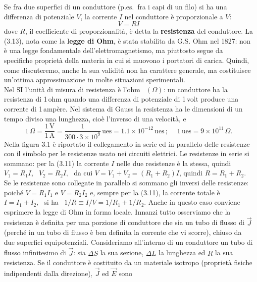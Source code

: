 Se fra due superfici di un conduttore (p.es.\ fra i capi di un filo) si ha una
differenza di potenziale $V$, la corrente $I$ nel conduttore \`e proporzionale a
$V$:
\begin{equation}
  V=RI
  \tag{3.13}
\end{equation}
dove $R$, il coefficiente di proporzionalit\`a, \`e detta la \textbf{resistenza}
del conduttore. La (3.13), nota come la \textbf{legge di Ohm}, \`e stata
stabilita da G.S. Ohm nel 1827: non \`e una legge fondamentale
dell'elettromagnetismo, ma piuttosto segue da specifiche propriet\`a della
materia in cui si muovono i portatori di carica. Quindi, come discuteremo, anche
la sua validit\`a non ha carattere generale, ma costituisce un'ottima
approssimazione in molte situazioni sperimentali.\\
Nel SI l'unit\`a di misura di resistenza \`e l'ohm \ $(\Omega)$: un conduttore
ha la resistenza di 1\,ohm quando una differenza di potenziale di 1\,volt
produce una corrente di 1\,amp\`ere. Nel sistema di Gauss la resistenza ha le
dimensioni di un tempo diviso una lunghezza, cio\`e l'inverso di una velocit\`a,
e
\begin{equation}
  1\,\Omega=\frac{1\,\mathrm V}{1\,\mathrm A}
  =\frac{1}{300\cdot3\times10^9}\,\mathrm{ues}
  =1.1\times10^{-12}\,\mathrm{ues}\,;
  \quad\ 1\,\mathrm{ues}=9\times10^{11}\,\Omega.
  \tag{3.14}
\end{equation}
Nella figura 3.1 \`e riportato il collegamento in serie ed in parallelo delle
resistenze con il simbolo per le resistenze usato nei circuiti elettrici. Le
resistenze in serie si sommano: per la (3.11) la corrente $I$ nelle due
resistenze \`e la stessa, quindi $V_1=R_1I$, \ $V_2=R_2I$, \ da cui
$V=V_1+V_2=(R_1+R_2)I$, quindi $R=R_1+R_2$. Se le resistenze sono collegate in
parallelo si sommano gli inversi delle resistenze: poich\'e $V=R_1I_1$ e
$V=R_2I_2$ e, sempre per la (3.11), la corrente totale \`e $I=I_1+I_2$, \ si ha
\ $1/R\equiv I/V=1/R_1+1/R_2$.
Anche in questo caso conviene esprimere la legge di Ohm in forma locale. Innanzi
tutto osserviamo che la resistenza \`e definita per una porzione di conduttore
che sia un tubo di flusso di $\vec J$ (perch\'e in un tubo di flusso \`e ben
definita la corrente che vi scorre), chiuso da due superfici equipotenziali.
Consideriamo all'interno di un conduttore un tubo di flusso infinitesimo di
$\vec J$: sia $\Delta S$ la sua sezione, $\Delta L$ la lunghezza ed $R$ la sua
resistenza. Se il conduttore \`e costituito da un materiale isotropo
(propriet\`a fisiche indipendenti dalla direzione), $\vec J$ ed $\vec E$ sono
